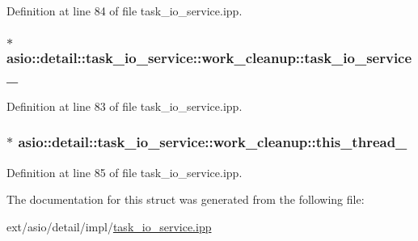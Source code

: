 Definition at line 84 of file task\+\_\+io\+\_\+service.\+ipp.

\hypertarget{structasio_1_1detail_1_1task__io__service_1_1work__cleanup_a71c21dcd60724674f4341e452f263db9}{}
\subsubsection[{task\+\_\+io\+\_\+service\+\_\+}]{$\ast$ asio\+::detail\+::task\+\_\+io\+\_\+service\+::work\+\_\+cleanup\+::task\+\_\+io\+\_\+service\+\_\+}\label{structasio_1_1detail_1_1task__io__service_1_1work__cleanup_a71c21dcd60724674f4341e452f263db9}


Definition at line 83 of file task\+\_\+io\+\_\+service.\+ipp.

\hypertarget{structasio_1_1detail_1_1task__io__service_1_1work__cleanup_ad836fdaf2f55a75497d35d0db2ac1ff6}{}
\subsubsection[{this\+\_\+thread\+\_\+}]{$\ast$ asio\+::detail\+::task\+\_\+io\+\_\+service\+::work\+\_\+cleanup\+::this\+\_\+thread\+\_\+}\label{structasio_1_1detail_1_1task__io__service_1_1work__cleanup_ad836fdaf2f55a75497d35d0db2ac1ff6}


Definition at line 85 of file task\+\_\+io\+\_\+service.\+ipp.



The documentation for this struct was generated from the following file\+:\begin{DoxyCompactItemize}
\item 
ext/asio/detail/impl/\hyperlink{task__io__service_8ipp}{task\+\_\+io\+\_\+service.\+ipp}\end{DoxyCompactItemize}
